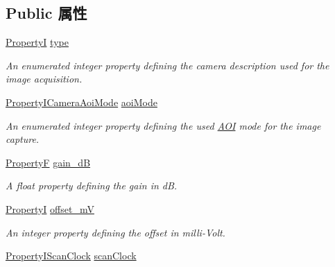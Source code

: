 \subsection*{Public 属性}
\begin{DoxyCompactItemize}
\item 
\hyperlink{group___common_interface_ga12d5e434238ca242a1ba4c6c3ea45780}{Property\+I} \hyperlink{classmv_i_m_p_a_c_t_1_1acquire_1_1_camera_settings_frame_grabber_a3cf5c97b03127b143d79619658e2edb9}{type}
\begin{DoxyCompactList}\small\item\em An enumerated integer property defining the camera description used for the image acquisition. \end{DoxyCompactList}\item 
\hyperlink{group___device_specific_interface_gac3481ade98270de3d8aa7ae47cbe5c4e}{Property\+I\+Camera\+Aoi\+Mode} \hyperlink{classmv_i_m_p_a_c_t_1_1acquire_1_1_camera_settings_frame_grabber_a7832a8f28a3896b5aeda151c30cefe1a}{aoi\+Mode}
\begin{DoxyCompactList}\small\item\em An enumerated integer property defining the used \hyperlink{struct_a_o_i}{A\+O\+I} mode for the image capture. \end{DoxyCompactList}\item 
\hyperlink{group___common_interface_gaf54865fe5a3d5cfd15f9a111b40d09f9}{Property\+F} \hyperlink{classmv_i_m_p_a_c_t_1_1acquire_1_1_camera_settings_frame_grabber_a53d9afd1f0e37c6af77840ee59e71dc2}{gain\+\_\+d\+B}
\begin{DoxyCompactList}\small\item\em A float property defining the gain in d\+B. \end{DoxyCompactList}\item 
\hyperlink{group___common_interface_ga12d5e434238ca242a1ba4c6c3ea45780}{Property\+I} \hyperlink{classmv_i_m_p_a_c_t_1_1acquire_1_1_camera_settings_frame_grabber_a276705f4a208d2956d6aeb94f56247c4}{offset\+\_\+m\+V}
\begin{DoxyCompactList}\small\item\em An integer property defining the offset in milli-\/\+Volt. \end{DoxyCompactList}\item 
\hyperlink{group___device_specific_interface_ga873cba8b9f282d5d983d2be1c8d3dcaa}{Property\+I\+Scan\+Clock} \hyperlink{classmv_i_m_p_a_c_t_1_1acquire_1_1_camera_settings_frame_grabber_a35d5ae8944b725349b617465e42a3b49}{scan\+Clock}

\end{DoxyCompactItemize}
